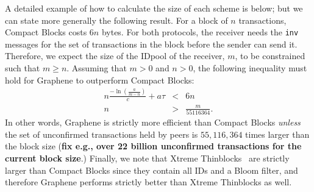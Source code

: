 A detailed example of how to calculate the size of each scheme is below; but we can state more generally the following result. For a
block of $n$ transactions, Compact Blocks costs $6n$ bytes. For both
protocols, the receiver needs the {\tt inv} messages for the set of
transactions in the block before the sender can send it. Therefore, we
expect the size of the IDpool of the receiver, $m$, to be constrained
such that $m \geq n$. Assuming that $m > 0$ and $n > 0$, the following
inequality must hold for Graphene to outperform Compact Blocks: 
\begin{eqnarray}
n\frac{-\ln(\frac{a}{m-n})}{c}+ a\tau &<& 6n\\
n&>& \frac{m}{55116364}.
\end{eqnarray}
In other words, Graphene is strictly more efficient than Compact Blocks {\em unless} the  set of unconfirmed transactions held by peers  is $55,116,364$ times larger than the block size (\textbf{fix e.g.,  over 22 billion unconfirmed transactions for the current block size}.)  Finally, we note that Xtreme Thinblocks~\cite{Tschipper:2016} are  strictly larger than Compact Blocks since they contain all IDs and a Bloom filter, and therefore Graphene performs strictly better than Xtreme Thinblocks as well. 

